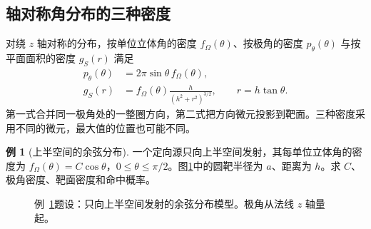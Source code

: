 \documentclass[11pt,openany,fontset=fandol]{ctexbook}
\theoremstyle{definition}\newtheorem{example}{例}[chapter]\newtheorem{exercise}{习题}[chapter]
\begin{document}
\subsection{轴对称角分布的三种密度}
对绕 $z$ 轴对称的分布，按单位立体角的密度 $f_\Omega(\theta)$、按极角的密度 $p_\theta(\theta)$ 与按平面面积的密度 $g_S(r)$ 满足
\begin{align*}
p_\theta(\theta)&=2\pi\sin\theta\,f_\Omega(\theta),\\
g_S(r)&=f_\Omega(\theta)\frac h{(h^2+r^2)^{3/2}},
\qquad r=h\tan\theta.
\end{align*}
第一式合并同一极角处的一整圈方向，第二式把方向微元投影到靶面。三种密度采用不同的微元，最大值的位置也可能不同。

\par\medskip\noindent\begin{minipage}{\textwidth}
\begin{example}[上半空间的余弦分布]\label{mp1:ex:e6}
一个定向源只向上半空间发射，其每单位立体角的密度为 $f_\Omega(\theta)=C\cos\theta$，$0\le\theta\le\pi/2$。图\ref{mp1:fig:e6-q}中的圆靶半径为 $a$、距离为 $h$。求 $C$、极角密度、靶面密度和命中概率。
\end{example}

\begin{figure}[H]\centering

\caption{例~\ref{mp1:ex:e6}题设：只向上半空间发射的余弦分布模型。极角从法线 $z$ 轴量起。}\label{mp1:fig:e6-q}
\end{figure}

\end{minipage}\par\medskip
\end{document}
